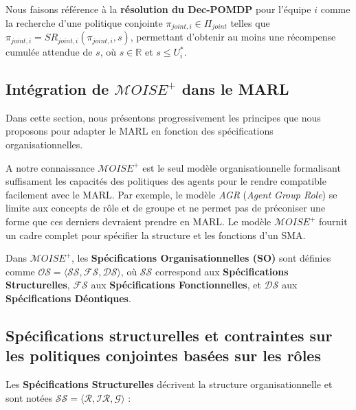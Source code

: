 \documentclass[sigconf,anonymous]{aamas}
\begin{document}
Nous faisons référence à la \textbf{résolution du Dec-POMDP} pour l'équipe $i$ comme la recherche d'une politique conjointe $\pi_{joint,i} \in \Pi_{joint}$ telles que $\pi_{joint,i} = SR_{joint,i}(\pi_{joint,i}, s)$, permettant d'obtenir au moins une récompense cumulée attendue de $s$, où $s \in \mathbb{R}$ et $s \leq U_i^*$.

\subsection{Intégration de $\mathcal{M}OISE^+$ dans le MARL}

Dans cette section, nous présentons progressivement les principes que nous proposons pour adapter le MARL en fonction des spécifications organisationnelles.

A notre connaissance $\mathcal{M}OISE^+$ est le seul modèle organisationnelle formalisant suffisament les capacités des politiques des agents pour le rendre compatible facilement avec le MARL. Par exemple, le modèle \textit{AGR} (\textit{Agent Group Role}) se limite aux concepts de rôle et de groupe et ne permet pas de préconiser une forme que ces derniers devraient prendre en MARL. Le modèle $\mathcal{M}OISE^+$ fournit un cadre complet pour spécifier la structure et les fonctions d'un SMA.

Dans $\mathcal{M}OISE^+$, les \textbf{Spécifications Organisationnelles (SO)} sont définies comme $\mathcal{OS} = \langle \mathcal{SS}, \mathcal{FS}, \mathcal{DS} \rangle$, où $\mathcal{SS}$ correspond aux \textbf{Spécifications Structurelles}, $\mathcal{FS}$ aux \textbf{Spécifications Fonctionnelles}, et $\mathcal{DS}$ aux \textbf{Spécifications Déontiques}.

\subsection{Spécifications structurelles et contraintes sur les politiques conjointes basées sur les rôles}

Les \textbf{Spécifications Structurelles} décrivent la structure organisationnelle et sont notées $\mathcal{SS} = \langle \mathcal{R}, \mathcal{IR}, \mathcal{G} \rangle$ :
\end{document}
